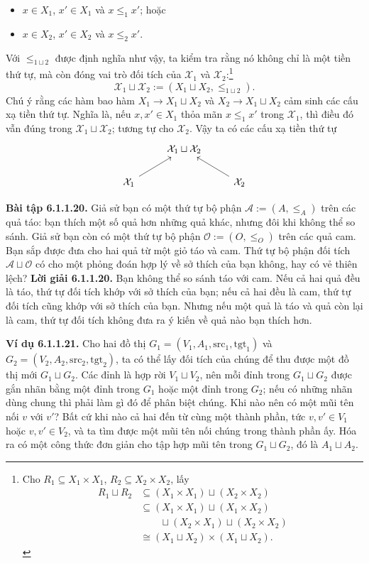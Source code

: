 \begin{itemize}
\item $x\in X_1$, $x'\in X_1$ và $x\le_1x'$; hoặc
\item $x\in X_2$, $x'\in X_2$ và $x\le_2x'$.
\end{itemize}
Với $\le_{1\sqcup2}$ được định nghĩa như vậy, ta kiểm tra rằng nó không chỉ là một tiền thứ tự, mà còn đóng vai trò đối tích của $\mathcal X_1$ và $\mathcal X_2$:\footnote{Cho $R_1\subseteq X_1\times X_1$, $R_2\subseteq X_2\times X_2$, lấy
\[\begin{aligned}R_1\sqcup R_2&\subseteq(X_1\times X_1)\sqcup(X_2\times X_2)\\&\subseteq(X_1\times X_1)\sqcup(X_1\times X_2)\\&\qquad\sqcup(X_2\times X_1)\sqcup(X_2\times X_2)\\&\cong(X_1\sqcup X_2)\times(X_1\sqcup X_2).\end{aligned}\]}
\[\mathcal X_1\sqcup\mathcal X_2:=(X_1\sqcup X_2,\le_{1\sqcup2}).\]
Chú ý rằng các hàm bao hàm $X_1\to X_1\sqcup X_2$ và $X_2\to X_1\sqcup X_2$ cảm sinh các cấu xạ tiền thứ tự. Nghĩa là, nếu $x,x'\in X_1$ thỏa mãn $x\le_1x'$ trong $\mathcal X_1$, thì điều đó vẫn đúng trong $\mathcal X_1\sqcup\mathcal X_2$; tương tự cho $\mathcal X_2$. Vậy ta có các cấu xạ tiền thứ tự
\[\begin{tikzcd}&\mathcal X_1\sqcup\mathcal X_2&\\\mathcal X_1\arrow[ur]&&\mathcal X_2\arrow[ul]\end{tikzcd}\]

\noindent\textbf{Bài tập 6.1.1.20.} Giả sử bạn có một thứ tự bộ phận $\mathcal A:=(A,\le_A)$ trên các quả táo: bạn thích một số quả hơn những quả khác, nhưng đôi khi không thể so sánh. Giả sử bạn còn có một thứ tự bộ phận $\mathcal O:=(O,\le_O)$ trên các quả cam. Bạn sắp được đưa cho hai quả từ một giỏ táo và cam. Thứ tự bộ phận đối tích $\mathcal A\sqcup\mathcal O$ có cho một phỏng đoán hợp lý về sở thích của bạn không, hay có vẻ thiên lệch?
\noindent\textbf{Lời giải 6.1.1.20.} Bạn không thể so sánh táo với cam. Nếu cả hai quả đều là táo, thứ tự đối tích khớp với sở thích của bạn; nếu cả hai đều là cam, thứ tự đối tích cũng khớp với sở thích của bạn. Nhưng nếu một quả là táo và quả còn lại là cam, thứ tự đối tích không đưa ra ý kiến về quả nào bạn thích hơn.

\noindent\textbf{Ví dụ 6.1.1.21.} Cho hai đồ thị $G_1=(V_1,A_1,\mathrm{src}_1,\mathrm{tgt}_1)$ và $G_2=(V_2,A_2,\mathrm{src}_2,\mathrm{tgt}_2)$, ta có thể lấy đối tích của chúng để thu được một đồ thị mới $G_1\sqcup G_2$. Các đỉnh là hợp rời
$V_1\sqcup V_2$, nên mỗi đỉnh trong $G_1\sqcup G_2$ được gắn nhãn bằng một đỉnh trong $G_1$ hoặc một đỉnh trong $G_2$; nếu có những nhãn dùng chung thì phải làm gì đó để phân biệt chúng. Khi nào nên có một mũi tên nối $v$ với $v'$? Bất cứ khi nào cả hai đến từ cùng một thành phần, tức $v,v'\in V_1$ hoặc $v,v'\in V_2$, và ta tìm được một mũi tên nối chúng trong thành phần ấy. Hóa ra có một công thức đơn giản cho tập hợp mũi tên trong $G_1\sqcup G_2$, đó là $A_1\sqcup A_2$.

